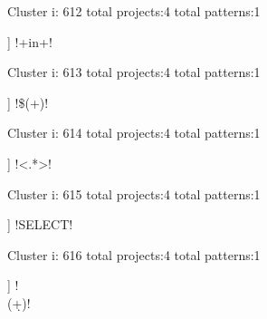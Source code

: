 Cluster i: 612
total projects:4
total patterns:1
\begin{multicols}{1}
\begin{description}[noitemsep,topsep=0pt]
\item [[4] ] \cverb!\s+in\s+!
\end{description}
\end{multicols}







Cluster i: 613
total projects:4
total patterns:1
\begin{multicols}{1}
\begin{description}[noitemsep,topsep=0pt]
\item [[4] ] \cverb!\$(\w+)!
\end{description}
\end{multicols}







Cluster i: 614
total projects:4
total patterns:1
\begin{multicols}{1}
\begin{description}[noitemsep,topsep=0pt]
\item [[4] ] \cverb!<\?.*\?>!
\end{description}
\end{multicols}







Cluster i: 615
total projects:4
total patterns:1
\begin{multicols}{1}
\begin{description}[noitemsep,topsep=0pt]
\item [[4] ] \cverb!\s*SELECT!
\end{description}
\end{multicols}







Cluster i: 616
total projects:4
total patterns:1
\begin{multicols}{1}
\begin{description}[noitemsep,topsep=0pt]
\item [[4] ] \cverb!\\(\d+)!
\end{description}
\end{multicols}







